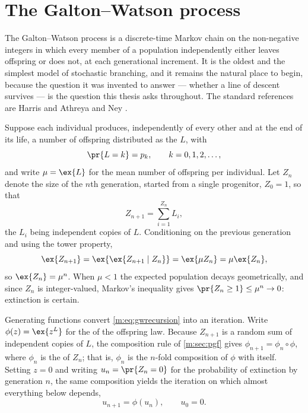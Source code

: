 \section{The Galton--Watson process}
\label{m:sec:gw}

The Galton--Watson process is a discrete-time Markov chain on the non-negative
integers in which every member of a population independently either leaves
offspring or does not, at each generational increment. It is the oldest and the
simplest model of stochastic branching, and it remains the natural place to begin,
because the question it was invented to answer --- whether a line of descent
survives --- is the question this thesis asks throughout. The standard references
are Harris \cite{Harris1963} and Athreya and Ney \cite{Athreya1972}.

Suppose each individual produces, independently of every other and at the end of
its life, a number of offspring distributed as the \rv{} $L$, with
\begin{equation*}
\pr{L = k} = p_k,\qquad k=0,1,2,\dots,
\end{equation*}
and write $\mu = \ex{L}$ for the mean number of offspring per individual. Let
$Z_n$ denote the size of the $n$th generation, started from a single progenitor,
$Z_0 = 1$, so that
\begin{equation}
\label{m:eq:gwrecursion}
Z_{n+1} = \sum_{i=1}^{Z_n}L_i ,
\end{equation}
the $L_i$ being independent copies of $L$. Conditioning on the previous generation
and using the tower property,
\begin{equation*}
\ex{Z_{n+1}} = \ex{\ex{Z_{n+1}\mid Z_n}} = \ex{\mu Z_n} = \mu\ex{Z_n},
\end{equation*}
so $\ex{Z_n} = \mu^n$. When $\mu<1$ the expected population decays geometrically,
and since $Z_n$ is integer-valued, Markov's inequality gives
$\pr{Z_n\ge1}\le\mu^n\to0$: extinction is certain.

Generating functions convert \cref{m:eq:gwrecursion} into an iteration. Write
$\phi(z) = \ex{z^{L}}$ for the \pgf{} of the offspring law. Because $Z_{n+1}$ is a
random sum of independent copies of $L$, the composition rule of \cref{m:sec:pgf}
gives $\phi_{n+1} = \phi_n\circ\phi$, where $\phi_n$ is the \pgf{} of $Z_n$; that
is, $\phi_n$ is the $n$-fold composition of $\phi$ with itself. Setting $z=0$ and
writing $u_n = \pr{Z_n=0}$ for the probability of extinction by generation $n$, the
same composition yields the iteration on which almost everything below depends,
\begin{equation}
\label{m:eq:iterPGF}
u_{n+1} = \phi(u_n),\qquad u_0 = 0 .
\end{equation}

